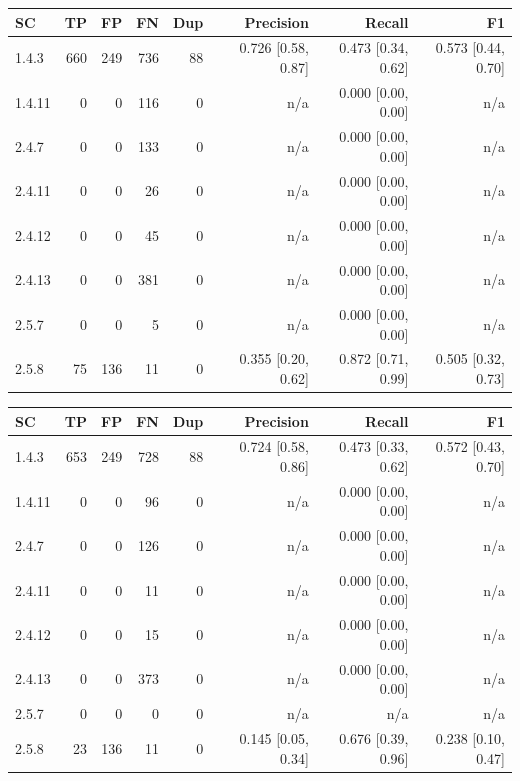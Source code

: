 \begin{tabular}{lrrrrrrr}
\hline
SC & TP & FP & FN & Dup & Precision & Recall & F1 \\
\hline
1.4.3 & 660 & 249 & 736 & 88 & 0.726 [0.58, 0.87] & 0.473 [0.34, 0.62] & 0.573 [0.44, 0.70] \\
1.4.11 & 0 & 0 & 116 & 0 & n/a & 0.000 [0.00, 0.00] & n/a \\
2.4.7 & 0 & 0 & 133 & 0 & n/a & 0.000 [0.00, 0.00] & n/a \\
2.4.11 & 0 & 0 & 26 & 0 & n/a & 0.000 [0.00, 0.00] & n/a \\
2.4.12 & 0 & 0 & 45 & 0 & n/a & 0.000 [0.00, 0.00] & n/a \\
2.4.13 & 0 & 0 & 381 & 0 & n/a & 0.000 [0.00, 0.00] & n/a \\
2.5.7 & 0 & 0 & 5 & 0 & n/a & 0.000 [0.00, 0.00] & n/a \\
2.5.8 & 75 & 136 & 11 & 0 & 0.355 [0.20, 0.62] & 0.872 [0.71, 0.99] & 0.505 [0.32, 0.73] \\
\hline
\end{tabular}

\begin{tabular}{lrrrrrrr}
\hline
SC & TP & FP & FN & Dup & Precision & Recall & F1 \\
\hline
1.4.3 & 653 & 249 & 728 & 88 & 0.724 [0.58, 0.86] & 0.473 [0.33, 0.62] & 0.572 [0.43, 0.70] \\
1.4.11 & 0 & 0 & 96 & 0 & n/a & 0.000 [0.00, 0.00] & n/a \\
2.4.7 & 0 & 0 & 126 & 0 & n/a & 0.000 [0.00, 0.00] & n/a \\
2.4.11 & 0 & 0 & 11 & 0 & n/a & 0.000 [0.00, 0.00] & n/a \\
2.4.12 & 0 & 0 & 15 & 0 & n/a & 0.000 [0.00, 0.00] & n/a \\
2.4.13 & 0 & 0 & 373 & 0 & n/a & 0.000 [0.00, 0.00] & n/a \\
2.5.7 & 0 & 0 & 0 & 0 & n/a & n/a & n/a \\
2.5.8 & 23 & 136 & 11 & 0 & 0.145 [0.05, 0.34] & 0.676 [0.39, 0.96] & 0.238 [0.10, 0.47] \\
\hline
\end{tabular}

